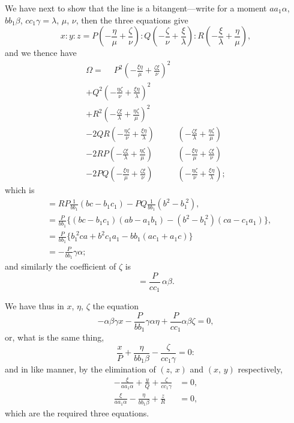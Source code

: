 \documentclass[11pt,a4paper]{book}
\begin{document}
We have next to show that the line is a bitangent---write for a moment $aa_1\alpha$, $bb_1\beta$, $cc_1\gamma = \lambda$, $\mu$, $\nu$, then the three equations give
\[
x : y : z = P\left(-\frac{\eta}{\mu} + \frac{\zeta}{\nu}\right) : Q\left(-\frac{\zeta}{\nu} + \frac{\xi}{\lambda}\right) : R\left(-\frac{\xi}{\lambda} + \frac{\eta}{\mu}\right),
\]
and we thence have
\begin{align*}
\Omega =\phantom{+} P^2\left(-\frac{\xi\eta}{\mu} + \frac{\zeta\xi}{\nu}\right)^2&\\
+ Q^2\left(-\frac{\eta\zeta}{\nu} + \frac{\xi\eta}{\lambda}\right)^2&\\
+ R^2\left(-\frac{\zeta\xi}{\lambda} + \frac{\eta\zeta}{\mu}\right)^2&\\
- 2QR\left(-\frac{\eta\zeta}{\nu} + \frac{\xi\eta}{\lambda}\right)&\left(-\frac{\zeta\xi}{\lambda} + \frac{\eta\zeta}{\mu}\right)\\
- 2RP\left(-\frac{\zeta\xi}{\lambda} + \frac{\eta\zeta}{\mu}\right)&\left(-\frac{\xi\eta}{\mu} + \frac{\zeta\xi}{\nu}\right)\\
- 2PQ\left(-\frac{\xi\eta}{\mu} + \frac{\zeta\xi}{\nu}\right)&\left(-\frac{\eta\zeta}{\nu} + \frac{\xi\eta}{\lambda}\right);
\end{align*}
which is
\begin{align*}
&= RP\frac{1}{bb_1}(bc - b_1c_1) - PQ\frac{1}{bb_1}(b^2 - b_1^{\;2}),\\
&= \frac{P}{bb_1}\{(bc - b_1c_1)(ab - a_1b_1) - (b^2 - b_1^{\;2})(ca - c_1a_1)\},\\
&= \frac{P}{bb_1}\{b_1^{\;2}ca + b^2c_1a_1 - bb_1(ac_1 + a_1c)\}\\
&= -\frac{P}{bb_1}\gamma\alpha;
\end{align*}
and similarly the coefficient of $\zeta$ is
\[
= \frac{P}{cc_1}\,\alpha\beta.
\]

We have thus in $x$, $\eta$, $\zeta$ the equation
\[
-\alpha\beta\gamma x - \frac{P}{bb_1}\gamma\alpha\eta + \frac{P}{cc_1}\alpha\beta\zeta = 0,
\]
or, what is the same thing,
\[
\frac{x}{P} + \frac{\eta}{bb_1\beta} - \frac{\zeta}{cc_1\gamma} = 0:
\]
and in like manner, by the elimination of $(z,\,x)$ and $(x,\,y)$ respectively,
\begin{align*}
-\frac{\xi}{aa_1\alpha} + \frac{y}{Q} + \frac{\zeta}{cc_1\gamma} &= 0,\\
\frac{\xi}{aa_1\alpha} - \frac{\eta}{bb_1\beta} + \frac{z}{R} &= 0,
\end{align*}
which are the required three equations.
\clearpage
\end{document}

